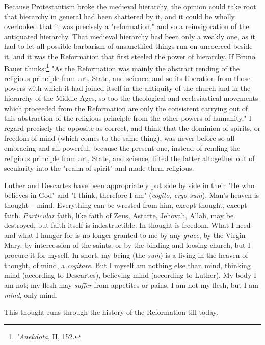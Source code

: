\documentclass[a4paper]{book}
\begin{document}
Because Protestantism broke the medieval hierarchy, the opinion could take 
root that hierarchy in general had been shattered by it, and it could be 
wholly overlooked that it was precisely a "{}reformation,"{} and so a 
reinvigoration of the antiquated hierarchy. That medieval hierarchy had been 
only a weakly one, as it had to let all possible barbarism of unsanctified 
things run on uncoerced beside it, and it was the Reformation that first 
steeled the power of hierarchy. If Bruno Bauer 
thinks:\footnote{\textit{"{}Anekdota}, II, 152.} "{}As the Reformation was 
mainly the abstract rending of the religious principle from art, State, and 
science, and so its liberation from those powers with which it had joined 
itself in the antiquity of the church and in the hierarchy of the Middle Ages, 
so too the theological and ecclesiastical movements which proceeded from the 
Reformation are only the consistent carrying out of this abstraction of the 
religious principle from the other powers of humanity,"{} I regard precisely 
the opposite as correct, and think that the dominion of spirits, or freedom of 
mind (which comes to the same thing), was never before so all-embracing and 
all-powerful, because the present one, instead of rending the religious 
principle from art, State, and science, lifted the latter altogether out of 
secularity into the "{}realm of spirit"{} and made them religious.

Luther and Descartes have been appropriately put side by side in their "{}He 
who believes in God"{} and "{}I think, therefore I am"{} (\textit{cogito, ergo 
sum}). Man's heaven is thought -- mind. Everything can be wrested from him, 
except thought, except faith. \textit{Particular} faith, like faith of Zeus, 
Astarte, Jehovah, Allah, may be destroyed, but faith itself is indestructible. 
In thought is freedom. What I need and what I hunger for is no longer granted 
to me by any \textit{grace}, by the Virgin Mary. by intercession of the 
saints, or by the binding and loosing church, but I procure it for myself. In 
short, my being (the \textit{sum}) is a living in the heaven of thought, of 
mind, a \textit{cogitare}. But I myself am nothing else than mind, thinking 
mind (according to Descartes), believing mind (according to Luther). My body I 
am not; my flesh may \textit{suffer} from appetites or pains. I am not my 
flesh, but I am \textit{mind}, only mind.

This thought runs through the history of the Reformation till today.
\end{document}
